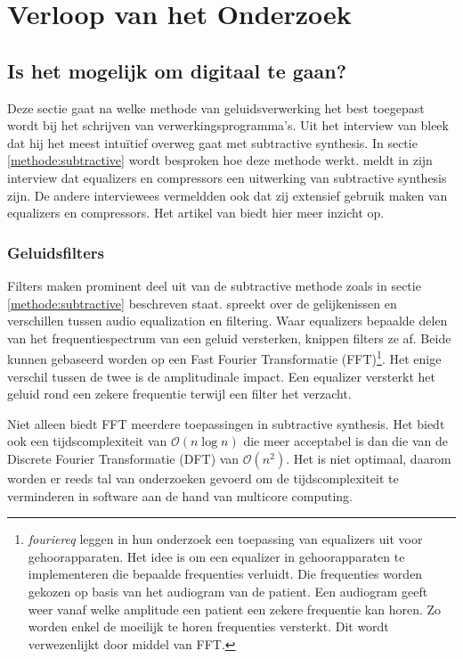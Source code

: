 \chapter{Verloop van het Onderzoek}
\label{onderzoek}

\section{Is het mogelijk om digitaal te gaan?}
\label{onderzoeksvraag1}

Deze sectie gaat na welke methode van geluidsverwerking het best toegepast wordt bij het schrijven van verwerkingsprogramma's. Uit het interview van \textcite{thomashouthave} bleek dat hij het meest intuïtief overweg gaat met subtractive synthesis. In sectie \ref{methode:subtractive} wordt besproken hoe deze methode werkt. \textcite{thomashouthave} meldt in zijn interview dat equalizers en compressors een uitwerking van subtractive synthesis zijn. De andere interviewees vermeldden ook dat zij extensief gebruik maken van equalizers en compressors. Het artikel van \textcite{filtervseq} biedt hier meer inzicht op.

\subsection{Geluidsfilters}

Filters maken prominent deel uit van de subtractive methode zoals in sectie \ref{methode:subtractive} beschreven staat. \textcite{filtervseq} spreekt over de gelijkenissen en verschillen tussen audio equalization en filtering. Waar equalizers bepaalde delen van het frequentiespectrum van een geluid versterken, knippen filters ze af. Beide kunnen gebaseerd worden op een Fast Fourier Transformatie (FFT)\footnote{\textit{fouriereq} leggen in hun onderzoek een toepassing van equalizers uit voor gehoorapparaten. Het idee is om een equalizer in gehoorapparaten te implementeren die bepaalde frequenties verluidt. Die frequenties worden gekozen op basis van het audiogram van de patient. Een audiogram geeft weer vanaf welke amplitude een patient een zekere frequentie kan horen. Zo worden enkel de moeilijk te horen frequenties versterkt. Dit wordt verwezenlijkt door middel van FFT.}. Het enige verschil tussen de twee is de amplitudinale impact. Een equalizer versterkt het geluid rond een zekere frequentie terwijl een filter het verzacht.

Niet alleen biedt FFT meerdere toepassingen in subtractive synthesis. Het biedt ook een tijdscomplexiteit van $\mathcal{O}(n\log{}n)$ die meer acceptabel is dan die van de Discrete Fourier Transformatie (DFT) van $\mathcal{O}(n^2)$.\autocite{ffttime} Het is niet optimaal, daarom worden er reeds tal van onderzoeken gevoerd om de tijdscomplexiteit te verminderen in software aan de hand van multicore computing. \autocite{robbievincke}

